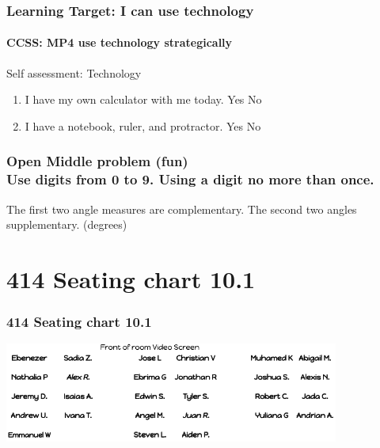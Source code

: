 \documentclass{beamer}
\begin{document}
  \frame
  {
    \frametitle{Learning Target: I can use technology}
    \framesubtitle{CCSS: MP4 use technology strategically}
  
    \begin{block}{Self assessment: Technology}
      
      \begin{enumerate}
      \item I have my own calculator with me today. Yes \qquad No
      \item I have a notebook, ruler, and protractor. Yes \qquad No
      \end{enumerate}
    \end{block}
  }

  \frame
  {
    \frametitle{Open Middle problem (fun) \\
    Use digits from 0 to 9. Using a digit no more than once.}
      The first two angle measures are complementary. The second two angles supplementary. (degrees)\\[0.75cm]
         \vspace{5cm} 
  }

  \section{414 Seating chart 10.1}
  \frame
  {
    \frametitle{414 Seating chart 10.1}
    \includegraphics[width=11cm]{Seating_10A-414.png}
  }
\end{document}
